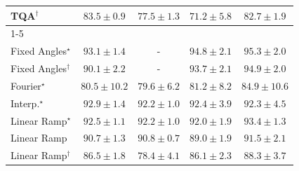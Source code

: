 \begin{tabular}{l|cccc|}
TQA$^\dagger$ & {\cellcolor[HTML]{298C48}} \color[HTML]{F1F1F1} $83.5\pm 0.9$ & {\cellcolor[HTML]{53B466}} \color[HTML]{F1F1F1} $77.5\pm 1.3$ & {\cellcolor[HTML]{93D284}} \color[HTML]{000000} $71.2\pm 5.8$ & {\cellcolor[HTML]{2E924C}} \color[HTML]{F1F1F1} $82.7\pm 1.9$ \\
\cline{1-5}
\multicolumn{5}{c}{\rule{0pt}{8pt}SV} \\
\midrule
Fixed Angles$^\star$ & {\cellcolor[HTML]{03466E}} \color[HTML]{F1F1F1} $93.1\pm 1.4$ & {\cellcolor[HTML]{000000}} \color[HTML]{F1F1F1} {\cellcolor{white}} \color{black} - & {\cellcolor[HTML]{023B5D}} \color[HTML]{F1F1F1} $94.8\pm 2.1$ & {\cellcolor[HTML]{023858}} \color[HTML]{F1F1F1} $95.3\pm 2.0$ \\
Fixed Angles$^\dagger$ & {\cellcolor[HTML]{04598C}} \color[HTML]{F1F1F1} $90.1\pm 2.2$ & {\cellcolor[HTML]{000000}} \color[HTML]{F1F1F1} {\cellcolor{white}} \color{black} - & {\cellcolor[HTML]{034267}} \color[HTML]{F1F1F1} $93.7\pm 2.1$ & {\cellcolor[HTML]{023A5B}} \color[HTML]{F1F1F1} $94.9\pm 2.0$ \\
Fourier$^\star$ & {\cellcolor[HTML]{2A88BC}} \color[HTML]{F1F1F1} $80.5\pm 10.2$ & {\cellcolor[HTML]{348EBF}} \color[HTML]{F1F1F1} $79.6\pm 6.2$ & {\cellcolor[HTML]{2484BA}} \color[HTML]{F1F1F1} $81.2\pm 8.2$ & {\cellcolor[HTML]{056FAE}} \color[HTML]{F1F1F1} $84.9\pm 10.6$ \\
Interp.$^\star$ & {\cellcolor[HTML]{03476F}} \color[HTML]{F1F1F1} $92.9\pm 1.4$ & {\cellcolor[HTML]{034B76}} \color[HTML]{F1F1F1} $92.2\pm 1.0$ & {\cellcolor[HTML]{034A74}} \color[HTML]{F1F1F1} $92.4\pm 3.9$ & {\cellcolor[HTML]{034B76}} \color[HTML]{F1F1F1} $92.3\pm 4.5$ \\
Linear Ramp$^\star$ & {\cellcolor[HTML]{034973}} \color[HTML]{F1F1F1} $92.5\pm 1.1$ & {\cellcolor[HTML]{034B76}} \color[HTML]{F1F1F1} $92.2\pm 1.0$ & {\cellcolor[HTML]{034C78}} \color[HTML]{F1F1F1} $92.0\pm 1.9$ & {\cellcolor[HTML]{03446A}} \color[HTML]{F1F1F1} $93.4\pm 1.3$ \\
Linear Ramp & {\cellcolor[HTML]{045585}} \color[HTML]{F1F1F1} $90.7\pm 1.3$ & {\cellcolor[HTML]{045585}} \color[HTML]{F1F1F1} $90.8\pm 0.7$ & {\cellcolor[HTML]{045E93}} \color[HTML]{F1F1F1} $89.0\pm 1.9$ & {\cellcolor[HTML]{034F7D}} \color[HTML]{F1F1F1} $91.5\pm 2.1$ \\
Linear Ramp$^\dagger$ & {\cellcolor[HTML]{0568A3}} \color[HTML]{F1F1F1} $86.5\pm 1.8$ & {\cellcolor[HTML]{4094C3}} \color[HTML]{F1F1F1} $78.4\pm 4.1$ & {\cellcolor[HTML]{056AA6}} \color[HTML]{F1F1F1} $86.1\pm 2.3$ & {\cellcolor[HTML]{046198}} \color[HTML]{F1F1F1} $88.3\pm 3.7$ \\

\end{tabular}
